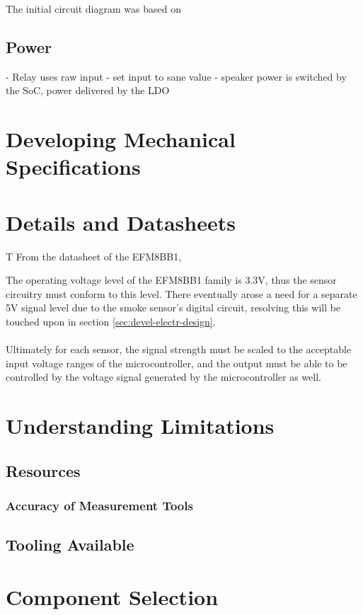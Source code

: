 \documentclass[12pt]{article}
\begin{document}
  The initial circuit diagram was based on 

	\subsection{Power}
  

  - Relay uses raw input - set input to sane value
  - speaker power is switched by the SoC, power delivered by the LDO
	
	\section{Developing Mechanical Specifications}
	
	\section{Details and Datasheets}
  T
  From the datasheet of the EFM8BB1\cite{silabs:efm8bb1},

  The operating voltage level of the EFM8BB1 family is 3.3V, thus the sensor circuitry must conform to this level. There eventually arose a need for a separate 5V signal level due to the smoke sensor's digital circuit, resolving this will be touched upon in section \ref{sec:devel-electr-design}.

  \paragraph{}
  Ultimately for each sensor, the signal strength must be scaled to the acceptable input voltage ranges of the microcontroller, and the output must be able to be controlled by the voltage signal generated by the microcontroller as well.
	\section{Understanding Limitations}
	\subsection{Resources}
  \subsubsection{Accuracy of Measurement Tools}
	\subsection{Tooling Available}
	
	\section{Component Selection}
	
\end{document}
